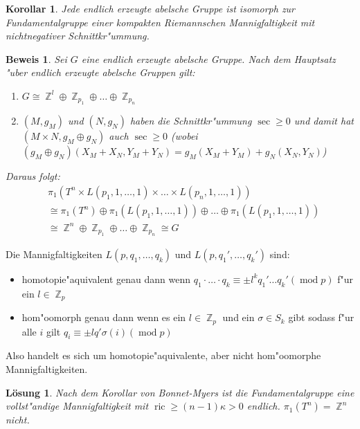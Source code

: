 \documentclass[paper=A4, twoside, chapterprefix=true, bibliography=totoc, headsepline]{scrbook}
\DeclareMathOperator{\Z}{\mathbb{Z}}
\DeclareMathOperator{\mmod}{mod} %
\DeclareMathOperator{\ric}{ric} %
\newcommand{\X}{\times}
\theoremstyle{plain}
\theoremstyle{nonumberplain}
\newtheorem{kor}{Korollar}
\newtheorem{bew}{Beweis}
\theoremstyle{empty}
\theoremstyle{break}
\newtheorem{Loes}{L\"osung}
\begin{document}
\begin{kor}
Jede endlich erzeugte abelsche Gruppe ist isomorph zur Fundamentalgruppe einer kompakten Riemannschen Mannigfaltigkeit mit nichtnegativer Schnittkr"ummung.
\end{kor}

\begin{bew}
Sei $G$ eine endlich erzeugte abelsche Gruppe.
Nach dem Hauptsatz "uber endlich erzeugte abelsche Gruppen gilt:
\begin{enumerate}[label=(\arabic*)]
\item
	$G \cong \Z^l \oplus \Z_{p_1} \oplus \ldots \oplus \Z_{p_n}$
\item
	$(M, g_M)$ und $(N, g_N)$ haben die Schnittkr"ummung $\sec \ge 0$ und damit hat $(M \X N, g_M \oplus g_N)$ auch $\sec \ge 0$ (wobei $(g_M \oplus g_N)(X_M + X_N, Y_M + Y_N) = g_M(X_M + Y_M) + g_N(X_N, Y_N)$)
\end{enumerate}
Daraus folgt:
\begin{align*}
	&\pi_1(T^n \X L(p_1, 1, \ldots ,1) \X \ldots \X L(p_n, 1, \ldots , 1)) \\
	&\cong \pi_1(T^n) \oplus \pi_1(L(p_1, 1, \ldots ,1)) \oplus \ldots \oplus \pi_1(L(p_1, 1, \ldots ,1)) \\
	&\cong \Z^n \oplus \Z_{p_1} \oplus \ldots \oplus \Z_{p_n} \cong G
\end{align*}
\end{bew}

Die Mannigfaltigkeiten $L(p, q_1, \ldots ,q_k)$ und $L(p, q_1', \ldots ,q_k')$ sind:\begin{itemize}
\item
	homotopie"aquivalent genau dann wenn $q_1 \cdot \ldots \cdot q_k \equiv \pm l^k q_1' \ldots q_k' (\mmod p)$ f"ur ein $l \in \Z_p$ \cite{olum}
\item
	hom"oomorph genau dann wenn es ein $l \in \Z_p$ und ein $\sigma \in S_k$ gibt sodass f"ur alle $i$ gilt $q_i \equiv \pm l q' \sigma(i) (\mmod p)$ \cite{brody1960}
\end{itemize}
Also handelt es sich um homotopie"aquivalente, aber nicht hom"oomorphe Mannigfaltigkeiten.

\begin{Loes}
Nach dem Korollar von Bonnet-Myers ist die Fundamentalgruppe eine vollst"andige Mannigfaltigkeit mit $\ric \ge (n-1) \kappa > 0$ endlich.
$\pi_1(T^n) = \Z^n$ nicht.
\end{Loes}
\end{document}
